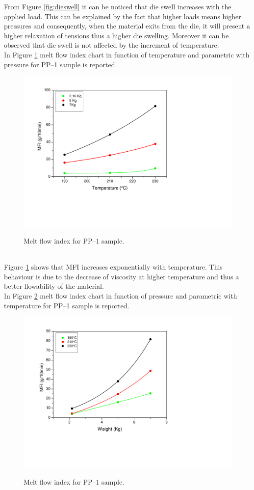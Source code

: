 \documentclass[a4paper, 11pt]{article}
\begin{document}
From Figure \ref{fig:dieswell} it can be noticed that die swell increases with the applied load. This can be explained by the fact that higher loads means higher pressures and consequently, when the material exits from the die, it will present a higher relaxation of tensions thus a higher die swelling. Moreover it can be observed that die swell is not affected by the increment of temperature. \\
In Figure \ref{fig:mfi} melt flow index chart in function of temperature and parametric with pressure for PP–1 sample is reported.
\begin{figure}[h!]
	\centering
	{\includegraphics[scale=0.4]{mfi}}
	\captionsetup{justification=centering}
	\caption{Melt flow index for PP–1 sample.}
	\label{fig:mfi}
\end{figure}\\
Figure \ref{fig:mfi} shows that MFI increases exponentially with temperature. This behaviour is due to the decrease of viscosity at higher temperature and thus a better flowability of the material.\\
In Figure \ref{fig:mfi2} melt flow index chart in function of pressure and parametric with temperature for PP–1 sample is reported.
\begin{figure}[h!]
	\centering
	{\includegraphics[scale=0.4]{mfi2}}
	\captionsetup{justification=centering}
	\caption{Melt flow index for PP–1 sample.}
	\label{fig:mfi2}
\end{figure}\\
\end{document}
